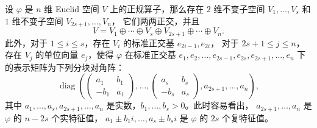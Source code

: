 \documentclass[fontset=none,zihao=-4]{Notes}
\DeclareMathOperator\diag{diag}
\begin{document}
\begin{theorem}[实正规算子的正交相似标准型]\label{thm:canonical form of real normal operator}
  设 $\varphi$ 是 $n$ 维 Euclid 空间 $V$ 上的正规算子，那么存在 $2$
  维不变子空间 $V_1,\dots,V_s$ 和 $1$ 维不变子空间 $V_{2s+1},\dots,V_{n}$，
  它们两两正交，并且
  \[
    V=V_1\oplus \cdots\oplus V_s\oplus V_{2s+1}\oplus\cdots\oplus V_n.  
  \]
  此外，对于 $1\leq i\leq s$，存在 $V_i$ 的标准正交基 $e_{2i-1},e_{2i}$，
  对于 $2s+1\leq j\leq n$，存在 $V_j$ 的单位向量 $e_j$，使得 $\varphi$
  在标准正交基 $e_1,e_2,\dots,e_{2s-1},e_{2s},e_{2s+1},\dots,e_n$ 下
  的表示矩阵为下列分块对角阵：
  \[
    \diag\left(
    \begin{pmatrix}
      a_1 & b_1 \\
      -b_1 & a_1
    \end{pmatrix},\dots,
    \begin{pmatrix}
      a_s & b_s \\
      -b_s & a_s
    \end{pmatrix},
    a_{2s+1},\dots,a_{n}
    \right)  ,
  \]
  其中 $a_1,\dots,a_s,a_{2s+1},\dots,a_n$ 是实数，$b_1,\dots,b_s>0$。此时容易看出，
  $a_{2s+1},\dots,a_n$ 是 $\varphi$ 的 $n-2s$ 个实特征值，
  $a_1\pm b_1i,\dots,a_s\pm b_si$ 是 $\varphi$ 的 $2s$ 个复特征值。
\end{theorem}
\end{document}

